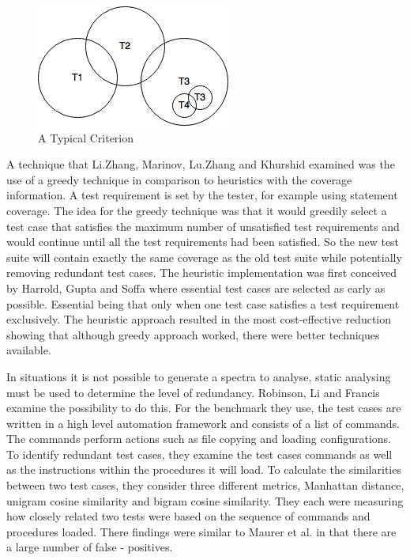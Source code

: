 \begin{figure}[h]
\begin{center}
\includegraphics[]{VennDiagram.jpg}
\end{center}
\caption{A Typical Criterion}
\label{fig:venndiagram}
\end{figure}

A technique that Li.Zhang, Marinov, Lu.Zhang and Khurshid \cite{zhang2011empirical} examined was the use of a greedy technique in comparison to heuristics with the coverage information. A test requirement is set by the tester, for example using statement coverage. The idea for the greedy technique was that it would greedily select a test case that satisfies the maximum number of unsatisfied test requirements and would continue until all the test requirements had been satisfied. So the new test suite will contain exactly the same coverage as the old test suite while potentially removing redundant test cases. The heuristic implementation was first conceived by Harrold, Gupta and Soffa \cite{harrold1993methodology} where essential test cases are selected as early as possible. Essential being that only when one test case satisfies a test requirement exclusively. The heuristic approach resulted in the most cost-effective reduction showing that although greedy approach worked, there were better techniques available.

In situations it is not possible to generate a spectra to analyse, static analysing must be used to determine the level of redundancy. Robinson, Li and Francis \cite{li2008static} examine the possibility to do this. For the benchmark they use, the test cases are written in a high level automation framework and consists of a list of commands. The commands perform actions such as file copying and loading configurations. To identify redundant test cases, they examine the test cases commands as well as the instructions within the procedures it will load. To calculate the similarities between two test cases, they consider three different metrics, Manhattan distance, unigram cosine similarity and bigram cosine similarity. They each were measuring how closely related two tests were based on the sequence of commands and procedures loaded. There findings were similar to Maurer et al. \cite{koochakzadeh2009test} in that there are a large number of false - positives.


